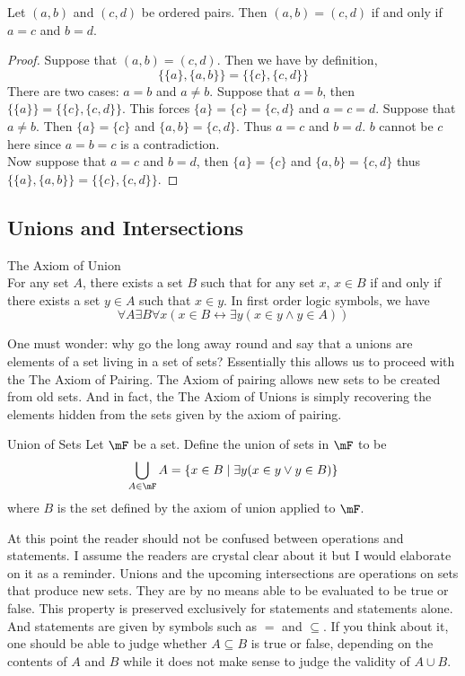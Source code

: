 \documentclass[a4paper]{article}
\begin{document}
\begin{prp}{}{} Let $(a,b)$ and $(c,d)$ be ordered pairs. Then $(a,b)=(c,d)$ if and only if $a=c$ and $b=d$. 
\begin{proof} Suppose that $(a,b)=(c,d)$. Then we have by definition, $$\{\{a\},\{a,b\}\}=\{\{c\},\{c,d\}\}$$ There are two cases: $a=b$ and $a\neq b$. Suppose that $a=b$, then $\{\{a\}\}=\{\{c\},\{c,d\}\}$. This forces $\{a\}=\{c\}=\{c,d\}$ and $a=c=d$. Suppose that $a\neq b$. Then $\{a\}=\{c\}$ and $\{a,b\}=\{c,d\}$. Thus $a=c$ and $b=d$. $b$ cannot be $c$ here since $a=b=c$ is a contradiction. \\

Now suppose that $a=c$ and $b=d$, then $\{a\}=\{c\}$ and $\{a,b\}=\{c,d\}$ thus $\{\{a\},\{a,b\}\}=\{\{c\},\{c,d\}\}$. 
\end{proof}
\end{prp}

\subsection{Unions and Intersections}
\begin{axm}{The Axiom of Union}{}\\
For any set $A$, there exists a set $B$ such that for any set $x$, $x\in B$ if and only if there exists a set $y\in A$ such that $x\in y$. In first order logic symbols, we have $$\forall A\exists B\forall x(x\in B\leftrightarrow\exists y(x\in y\wedge y\in A))$$
\end{axm}

One must wonder: why go the long away round and say that a unions are elements of a set living in a set of sets? Essentially this allows us to proceed with the The Axiom of Pairing. The Axiom of pairing allows new sets to be created from old sets. And in fact, the The Axiom of Unions is simply recovering the elements hidden from the sets given by the axiom of pairing. 

\begin{defn}{Union of Sets}{} Let $\mF$ be a set. Define the union of sets in $\mF$ to be $$\bigcup_{A\in\mF}A=\{x\in B\;|\;\exists y(x\in y\vee y\in B)\}$$ where $B$ is the set defined by the axiom of union applied to $\mF$. 
\end{defn}

At this point the reader should not be confused between operations and statements. I assume the readers are crystal clear about it but I would elaborate on it as a reminder. Unions and the upcoming intersections are operations on sets that produce new sets. They are by no means able to be evaluated to be true or false. This property is preserved exclusively for statements and statements alone. And statements are given by symbols such as $=$ and $\subseteq$. If you think about it, one should be able to judge whether $A\subseteq B$ is true or false, depending on the contents of $A$ and $B$ while it does not make sense to judge the validity of $A\cup B$. 
\end{document}
